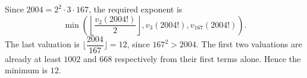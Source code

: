 Since $2004=2^2\cdot3\cdot167$, the required exponent is
\[
\min\left(\left\lfloor\dfrac{v_2(2004!)}{2}\right\rfloor,v_3(2004!),v_{167}(2004!)\right).
\]
The last valuation is $\lfloor\dfrac{2004}{167}\rfloor=12$, since $167^2>2004$. The first two valuations are already at least $1002$ and $668$ respectively from their first terms alone. Hence the minimum is $\boxed{12}$.
